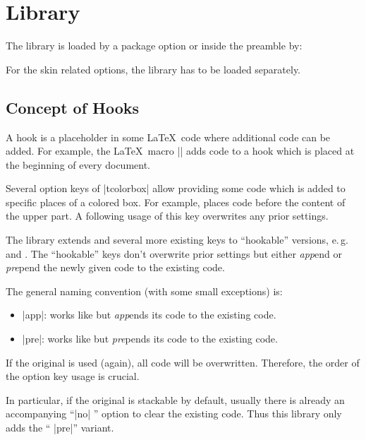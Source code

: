\clearpage
\section{Library }\label{sec:hooks}%
%
The library is loaded by a package option or inside the preamble by:
\begin{dispListing}
\end{dispListing}

For the skin related options, the library  has to be loaded
separately.


\subsection{Concept of Hooks}
A hook is a placeholder in some \LaTeX\ code where additional code
can be added. For example, the \LaTeX\ macro |\AtBeginDocument| adds code to a
hook which is placed at the beginning of every document.

Several option keys of |tcolorbox| allow providing some code which is
added to specific places of a colored box. For example, 
places code before the content of the upper part. A following usage of this
key overwrites any prior settings.

The library  extends  and several more
existing keys to \enquote{hookable} versions, e.\,g.\ 
 and .
The \enquote{hookable} keys don't overwrite prior settings but either \emph{app}end
or \emph{pre}pend the newly given code to the existing code.

The general naming convention (with some small exceptions) is:
\begin{itemize}
\item {} |app|: works like  but
  \emph{app}ends its code to the existing code.
\item {} |pre|: works like \meta{option key} but
  \emph{pre}pends its code to the existing code.
\end{itemize}
If the original  is used (again), all code will be overwritten.
Therefore, the order of the option key usage is crucial.

In particular, if the original  is stackable by default,
usually there is already an accompanying \enquote{|no| } option
to clear the existing code. Thus this library only adds the
\enquote{\meta{option key} |pre|} variant.

